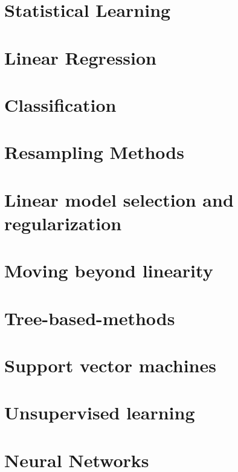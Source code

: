 \section{Statistical Learning}

\section{Linear Regression}

\section{Classification}

\section{Resampling Methods}

\section{Linear model selection and regularization}

\section{Moving beyond linearity}

\section{Tree-based-methods}

\section{Support vector machines}

\section{Unsupervised learning}

\section{Neural Networks}

